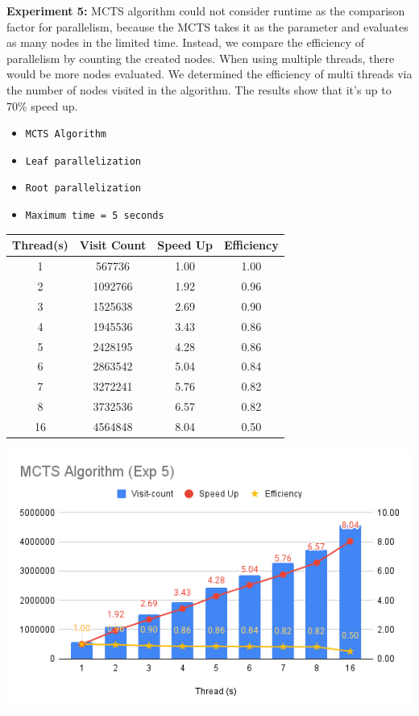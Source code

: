\documentclass[sigconf]{acmart}
\begin{document}
{\bfseries Experiment 5:}
MCTS algorithm could not consider runtime as the comparison factor for parallelism, because the MCTS takes it as the parameter and evaluates as many nodes in the limited time. Instead, we compare the efficiency of parallelism by counting the created nodes. When using multiple threads, there would be more nodes evaluated. We determined the efficiency of multi threads via the number of nodes visited in the algorithm. The results show that it’s up to 70\% speed up.

\begin{itemize}
\item {\verb|MCTS Algorithm|}
\item {\verb|Leaf parallelization|}
\item {\verb|Root parallelization|}
\item {\verb|Maximum time = 5 seconds|}
\end{itemize}
\begin{center}
  \label{tab:commands}
  \begin{tabular}{c c c c}
    \toprule
    Thread(s)& Visit Count & Speed Up & Efficiency\\
    \midrule
     1 &  567736 & 1.00 & 1.00\\
     2 & 1092766 & 1.92 & 0.96\\
     3 & 1525638 & 2.69 & 0.90\\
     4 & 1945536 & 3.43 & 0.86\\
     5 & 2428195 & 4.28 & 0.86\\
     6 & 2863542 & 5.04 & 0.84\\
     7 & 3272241 & 5.76 & 0.82\\
     8 & 3732536 & 6.57 & 0.82\\
    16 & 4564848 & 8.04 & 0.50\\
    \bottomrule
  \end{tabular}
\end{center}
\includegraphics[scale=0.40]{images/exp5.png}
\end{document}
